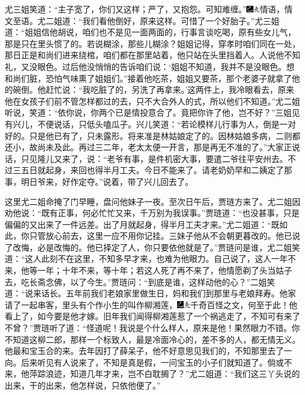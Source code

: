 尤三姐笑道：“主子宽了，你们又这样；严了，又抱怨。可知难缠。”{\includegraphics[width=3mm]{../Images/00003}\includegraphics[width=3mm]{../Images/00012}\footnotesize \kaishu 情语，情文至语。}尤二姐道：“我们看他倒好，原来这样。可惜了一个好胎子。”尤三姐道：“姐姐信他胡说，咱们也不是见一面两面的，行事言谈吃喝，原有些女儿气，那是只在里头惯了的。若说糊涂，那些儿糊涂？姐姐记得，穿孝时咱们同在一处，那日正是和尚们进来绕棺，咱们都在那里站着，他只站在头里挡着人。人说他不知礼，又没眼色。过后他没悄悄的告诉咱们说：‘姐姐不知道，我并不是没眼色。想和尚们脏，恐怕气味熏了姐姐们。”接着他吃茶，姐姐又要茶，那个老婆子就拿了他的碗倒。他赶忙说：“我吃脏了的，另洗了再拿来。’这两件上，我冷眼看去，原来他在女孩子们前不管怎样都过的去，只不大合外人的式，所以他们不知道。”尤二姐听说，笑道：“依你说，你两个已是情投意合了。竟把你许了他，岂不好？”三姐见有兴儿，不便说话，只低头嗑瓜子。兴儿笑道：“若论模样儿行事为人，倒是一对好的。只是他已有了，只未露形。将来准是林姑娘定了的。因林姑娘多病，二则都还小，故尚未及此。再过三二年，老太太便一开言，那是再无不准的了。”大家正说话，只见隆儿又来了，说：“老爷有事，是件机密大事，要遣二爷往平安州去。不过三五日就起身，来回也得半月工夫。今日不能来了。请老奶奶早和二姨定了那事，明日爷来，好作定夺。”说着，带了兴儿回去了。

这里尤二姐命掩了门早睡，盘问他妹子一夜。至次日午后，贾琏方来了。尤二姐因劝他说：“既有正事，何必忙忙又来，千万别为我误事。”贾琏道：“也没甚事，只是偏偏的又出来了一件远差。出了月就起身，得半月工夫才来。”尤二姐道：“既如此，你只管放心前去，这里一应不用你记挂。三妹子他从不会朝更暮改的。他已说了改悔，必是改悔的。他已择定了人，你只要依他就是了。”贾琏问是谁，尤二姐笑道：“这人此刻不在这里，不知多早才来，也难为他眼力。自己说了，这人一年不来，他等一年；十年不来，等十年；若这人死了再不来了，他情愿剃了头当姑子去，吃长斋念佛，以了今生。”贾琏问：“到底是谁，这样动他的心？”二姐笑道：“说来话长。五年前我们老娘家里做生日，妈和我们到那里与老娘拜寿。他家请了一起串客，里头有个作小生的叫作柳湘莲，{\includegraphics[width=3mm]{../Images/00003}\includegraphics[width=3mm]{../Images/00012}\footnotesize \kaishu 千奇百怪之文，何至于此！}他看上了，如今要是他才嫁。旧年我们闻得柳湘莲惹了一个祸逃走了，不知可有来了不曾？”贾琏听了道：“怪道呢！我说是个什么样人，原来是他！果然眼力不错。你不知道这柳二郎，那样一个标致人，最是冷面冷心的，差不多的人，都无情无义。他最和宝玉合的来。去年因打了薛呆子，他不好意思见我们的，不知那里去了一向。后来听见有人说来了，不知是真是假，一问宝玉的小子们就知道了。倘或不来，他萍踪浪迹，知道几年才来，岂不白耽搁了？”尤二姐道：“我们这三丫头说的出来，干的出来，他怎样说，只依他便了。”

